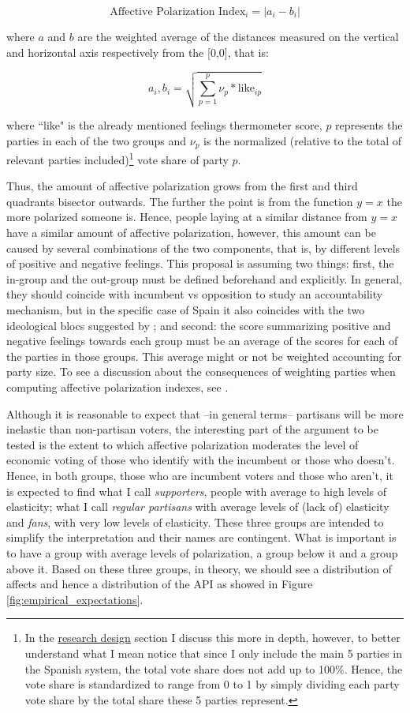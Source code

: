 \documentclass[a4paper, svgnames]{article}
\begin{document}
$$
	\text{Affective Polarization Index}_i = \lvert a_i - b_i \rvert
$$

where $a$ and $b$ are the weighted average of the distances measured on the vertical and horizontal axis respectively from the [0,0], that is:

$$
	a_i, b_i = \sqrt{\sum^p_{p=1}{\nu_p*\text{like}_{ip}}}
$$

where ``like" is the already mentioned feelings thermometer score, $p$ represents the parties in each of the two groups and $\nu_p$ is the normalized (relative to the total of relevant parties included)\footnote{In the \hyperref[section:research_design]{research design} section I discuss this more in depth, however, to better understand what I mean notice that since I only include the main 5 parties in the Spanish system, the total vote share does not add up to 100\%. Hence, the vote share is standardized to range from 0 to 1 by simply dividing each party vote share by the total share these 5 parties represent.} vote share of party $p$.

Thus, the amount of affective polarization grows from the first and third quadrants bisector outwards. The further the point is from the function $y=x$ the more polarized someone is. Hence, people laying at a similar distance from $y=x$ have a similar amount of affective polarization, however, this amount can be caused by several combinations of the two components, that is, by different levels of positive and negative feelings. This proposal is assuming two things: first, the in-group and the out-group must be defined beforehand and explicitly. In general, they should coincide with incumbent vs opposition to study an accountability mechanism, but in the specific case of Spain it also coincides with the two ideological blocs suggested by \citet*{Orriols2020}; and second: the score summarizing positive and negative feelings towards each group must be an average of the scores for each of the parties in those groups. This average might or not be weighted accounting for party size. To see a discussion about the consequences of weighting parties when computing affective polarization indexes, see \citet*{Wagner2021}.

Although it is reasonable to expect that --in general terms-- partisans will be more inelastic than non-partisan voters, the interesting part of the argument to be tested is the extent to which affective polarization moderates the level of economic voting of those who identify with the incumbent or those who doesn't. Hence, in both groups, those who are incumbent voters and those who aren't, it is expected to find what I call \textit{supporters}, people with average to high levels of elasticity; what I call \textit{regular partisans} with average levels of (lack of) elasticity and \textit{fans}, with very low levels of elasticity. These three groups are intended to simplify the interpretation and their names are contingent. What is important is to have a group with average levels of polarization, a group below it and a group above it. Based on these three groups, in theory, we should see a distribution of affects and hence a distribution of the API as showed in Figure \ref{fig:empirical_expectations}.
\end{document}
